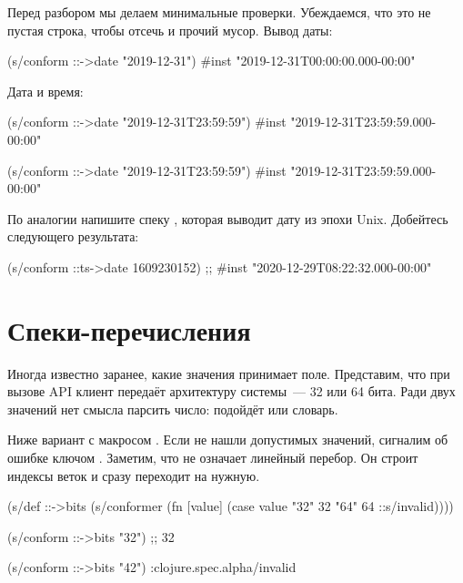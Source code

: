Перед разбором мы делаем минимальные проверки. Убеждаемся, что это не пустая
строка, чтобы отсечь  и прочий мусор. Вывод даты:

\begin{clojure}
(s/conform ::->date "2019-12-31")
#inst "2019-12-31T00:00:00.000-00:00"
\end{clojure}

\noindent
Дата и время:

\ifnarrow

\begin{clojure}
(s/conform ::->date
           "2019-12-31T23:59:59")
#inst "2019-12-31T23:59:59.000-00:00"
\end{clojure}

\else

\begin{clojure}
(s/conform ::->date "2019-12-31T23:59:59")
#inst "2019-12-31T23:59:59.000-00:00"
\end{clojure}

\fi

По аналогии напишите спеку , которая выводит дату из эпохи
Unix. Добейтесь следующего результата:

\begin{clojure}
(s/conform ::ts->date 1609230152)
;; #inst "2020-12-29T08:22:32.000-00:00"
\end{clojure}

\section{Спеки-перечисления}


Иногда известно заранее, какие значения принимает поле. Представим, что при
вызове API клиент передаёт архитектуру системы~--- 32 или 64 бита. Ради двух
значений нет смысла парсить число: подойдёт  или словарь.

Ниже вариант с макросом . Если не нашли допустимых значений, сигналим
об ошибке ключом . Заметим, что  не означает
линейный перебор. Он строит индексы веток и сразу переходит на нужную.


\ifnarrow

\begin{clojure}
(s/def ::->bits
  (s/conformer
   (fn [value]
     (case value
       "32" 32 "64" 64
       ::s/invalid))))

(s/conform ::->bits "32") ;; 32

(s/conform ::->bits "42")
:clojure.spec.alpha/invalid
\end{clojure}

